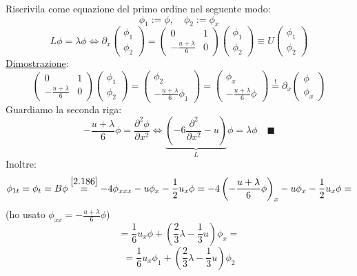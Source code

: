\documentclass[a4paper,11pt]{report}
\begin{document}
Riscrivila come equazione del primo ordine nel seguente modo:
\[
\phi_1:=\phi, \quad \phi_2:=\phi_x
\]
\begin{equation}
L\phi = \lambda \phi \Leftrightarrow \partial_x\left(\begin{matrix}
\phi_1 \\
\phi_2
\end{matrix}\right) = \left(\begin{matrix}
0 & 1 \\
-\frac{u+\lambda}{6} & 0
\end{matrix}\right)\left( \begin{matrix}
\phi_1 \\
\phi_2
\end{matrix} \right) \equiv U\left(\begin{matrix}
\phi_1 \\
\phi_2
\end{matrix}\right) 
\label{2.189}
\end{equation}
\underline{Dimostrazione}:
\[
\left(\begin{matrix}
0 & 1 \\
-\frac{u+\lambda}{6} & 0
\end{matrix}\right)\left( \begin{matrix}
\phi_1 \\
\phi_2
\end{matrix} \right) = \left(\begin{matrix}
\phi_2 \\
-\frac{u+\lambda}{6}\phi_1
\end{matrix}\right) = \left(\begin{matrix}
\phi_x \\
-\frac{u+\lambda}{6}\phi
\end{matrix}\right)\overset{!}{=} \partial_x \left(\begin{matrix}
\phi \\
\phi_x
\end{matrix}\right)
\]
Guardiamo la seconda riga: 
\[
-\frac{u+\lambda}{6}\phi = \frac{\partial^2 \phi}{\partial x^2} \Leftrightarrow \underset{L}{\underbrace{\left(-6\frac{\partial^2}{\partial x^2} - u\right)}}\phi = \lambda \phi \quad \blacksquare
\]
Inoltre:
\[
\phi_{1t}=\phi_t=B\phi \overset{\eqref{2.186}}{=} - 4\phi_{xxx} - u\phi_x - \frac{1}{2}u_x\phi =-4 \left(-\frac{u+\lambda}{6}\phi\right)_x - u\phi_x - \frac{1}{2}u_x\phi =
\]
(ho usato $\phi_{xx}=-\frac{u+\lambda}{6} \phi$)
\[
=\frac{1}{6} u_x \phi + \left(\frac{2}{3}\lambda - \frac{1}{3}u\right)\phi_x=
\]
\begin{equation}
=\frac{1}{6} u_x \phi_1 + \left(\frac{2}{3}\lambda - \frac{1}{3}u\right)\phi_2
\label{2.190}
\end{equation}
\end{document}
